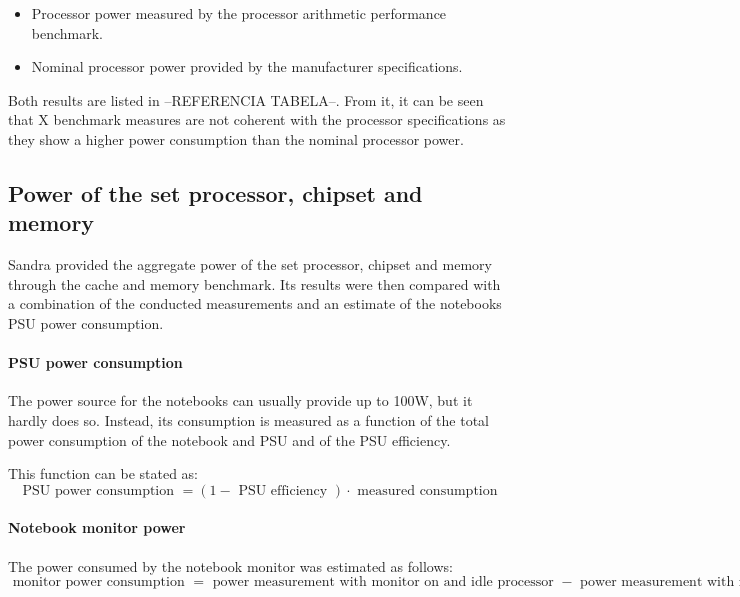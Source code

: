         \begin{itemize}
            \item Processor power measured by the processor arithmetic performance benchmark.
            \item Nominal processor power provided by the manufacturer specifications.
        \end{itemize}
        
        Both results are listed in --REFERENCIA TABELA--. From it, it can be seen that X benchmark measures are not coherent with the processor specifications as they show a higher power consumption than the nominal processor power.
        
    \subsection{Power of the set processor, chipset and  memory} \label{sec4:processor_power}
        
        Sandra provided the aggregate power of the set processor, chipset and memory through the cache and memory benchmark. Its results were then compared with a combination of the conducted measurements and an estimate of the notebooks PSU power consumption.
        
        \paragraph*{PSU power consumption}
            
            The power source for the notebooks can usually provide up to 100W, but it hardly does so. Instead, its consumption is measured as a function of the total power consumption of the notebook and PSU and of the PSU efficiency.
            
            This function can be stated as:
            \begin{equation}
                \text{ PSU power consumption } = (1 - \text{ PSU efficiency }) \cdot \text{ measured consumption }
                \label{psu_consumption}
            \end{equation}

        \paragraph*{Notebook monitor power}
        
            The power consumed by the notebook monitor was estimated as follows: 
            \begin{equation}
                \text{ monitor power consumption } = \text{ power measurement with monitor on and idle processor } - \text{ power measurement with monitor off and idle processor }
                \label{monitor_consumption}
            \end{equation}
            
